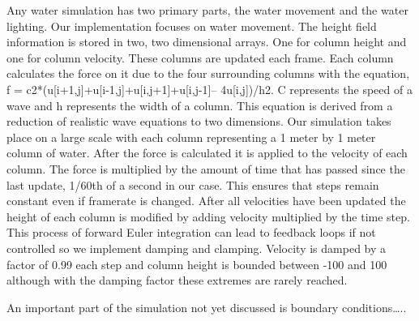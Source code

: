 \documentclass[12pt,titlepage]{article}
\begin{document}
Any water simulation has two primary parts, the water movement and the water lighting.  Our implementation focuses on water movement.  The height field information is stored in two, two dimensional arrays.  One for column height and one for column velocity.  These columns are updated each frame.  Each column calculates the force on it due to the four surrounding columns with the equation, f = c2*(u[i+1,j]+u[i-1,j]+u[i,j+1]+u[i,j-1]– 4u[i,j])/h2.  C represents the speed of a wave and h represents the width of a column.  This equation is derived from a reduction of realistic wave equations to two dimensions.  Our simulation takes place on a large scale with each column representing a 1 meter by 1 meter column of water.  After the force is calculated it is applied to the velocity of each column.  The force is multiplied by the amount of time that has passed since the last update, 1/60th of a second in our case.  This ensures that steps remain constant even if framerate is changed.  After all velocities have been updated the height of each column is modified by adding velocity multiplied by the time step.  This process of forward Euler integration can lead to feedback loops if not controlled so we implement damping and clamping.  Velocity is damped by a factor of 0.99 each step and column height is bounded between -100 and 100 although with the damping factor these extremes are rarely reached.
	
An important part of the simulation not yet discussed is boundary conditions…..
\end{document}
